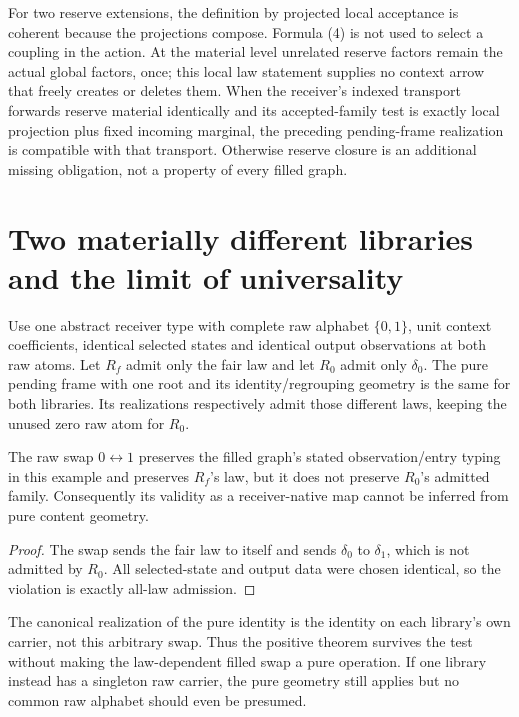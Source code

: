 \documentclass[11pt]{article}
\begin{document}
For two reserve extensions, the definition by projected local acceptance is coherent because the projections compose. Formula (4) is not used to select a coupling in the action. At the material level unrelated reserve factors remain the actual global factors, once; this local law statement supplies no context arrow that freely creates or deletes them. When the receiver's indexed transport forwards reserve material identically and its accepted-family test is exactly local projection plus fixed incoming marginal, the preceding pending-frame realization is compatible with that transport. Otherwise reserve closure is an additional missing obligation, not a property of every filled graph.

\section{Two materially different libraries and the limit of universality}
Use one abstract receiver type with complete raw alphabet $\{0,1\}$, unit context coefficients, identical selected states and identical output observations at both raw atoms. Let $R_f$ admit only the fair law and let $R_0$ admit only $\delta_0$. The pure pending frame with one root and its identity/regrouping geometry is the same for both libraries. Its realizations respectively admit those different laws, keeping the unused zero raw atom for $R_0$.

\begin{proposition}
The raw swap $0\leftrightarrow1$ preserves the filled graph's stated observation/entry typing in this example and preserves $R_f$'s law, but it does not preserve $R_0$'s admitted family. Consequently its validity as a receiver-native map cannot be inferred from pure content geometry.
\end{proposition}
\begin{proof}
The swap sends the fair law to itself and sends $\delta_0$ to $\delta_1$, which is not admitted by $R_0$. All selected-state and output data were chosen identical, so the violation is exactly all-law admission.\end{proof}

The canonical realization of the pure identity is the identity on each library's own carrier, not this arbitrary swap. Thus the positive theorem survives the test without making the law-dependent filled swap a pure operation. If one library instead has a singleton raw carrier, the pure geometry still applies but no common raw alphabet should even be presumed.
\end{document}
